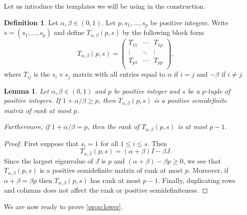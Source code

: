 \documentclass[reqno, 11pt]{amsart}
\newtheorem{lemma}[theorem]{Lemma}
\theoremstyle{definition}
\newtheorem{definition}[theorem]{Definition}
\theoremstyle{remark}
\begin{document}
Let us introduce the templates we will be using in the construction.

\begin{definition}\label{def:uniform-template}
     Let $\alpha, \beta \in (0,1)$. Let $p, s_1, \ldots, s_p$ be positive integers. Write $s = (s_1,\ldots,s_p)$ and define $T_{\alpha, \beta}(p, s)$ by the following block form
         \[
        T_{\alpha, \beta}(p, s) = \begin{pmatrix}
            T_{11} & \cdots & T_{1p} \\
            \vdots & \ddots & \vdots \\
            T_{p1} & \cdots & T_{pp} \\
        \end{pmatrix},
    \]
    where $T_{ij}$ is the $s_i \times s_j$ matrix with all entries equal to $\alpha$ if $i = j$ and $-\beta$ if $i \neq j$. 
\end{definition}

\begin{lemma}\label{lem:psd-template}
    Let $\alpha, \beta \in (0,1)$ and $p$ be positive integer and $s$ be a $p$-tuple of positive integers. If $1 + \alpha/\beta \geq p$, then $T_{\alpha,\beta}(p,s)$ is a positive semidefinite matrix of rank at most $p$. 
    
    Furthermore, if $1 + \alpha/\beta = p$, then the rank of $T_{\alpha,\beta}(p,s)$ is at most $p-1$.
\end{lemma}

\begin{proof}
    First suppose that $s_i = 1$ for all $1 \leq i \leq s$. Then 
    \[
        T_{\alpha, \beta}(p,s) = (\alpha  + \beta)I - \beta J.
    \]
    Since the largest eigenvalue of $J$ is $p$ and $(\alpha + \beta) - \beta p \geq 0$, we see that $T_{\alpha, \beta}(p,s)$ is a positive semidefinite matrix of rank at most $p$. Moreover, if $\alpha + \beta = \beta p$ then $T_{\alpha, \beta}(p,s)$ has rank at most $p-1$. Finally, duplicating rows and columns does not affect the rank or positive semidefiniteness.
\end{proof}

We are now ready to prove \cref{prop:lower}.
\end{document}
